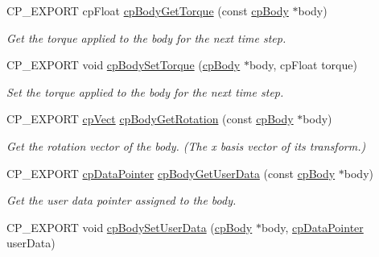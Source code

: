 \begin{DoxyCompactItemize}
C\+P\+\_\+\+E\+X\+P\+O\+RT cp\+Float \hyperlink{group__cpBody_ga77bde17091dff1496e695fbba26037bb}{cp\+Body\+Get\+Torque} (const \hyperlink{structcpBody}{cp\+Body} $\ast$body)
\begin{DoxyCompactList}\small\item\em Get the torque applied to the body for the next time step. \end{DoxyCompactList}\item 
\mbox{\label{group__cpBody_gade0bd4162880703b6e2f7a5de6a2fd0c}} 
C\+P\+\_\+\+E\+X\+P\+O\+RT void \hyperlink{group__cpBody_gade0bd4162880703b6e2f7a5de6a2fd0c}{cp\+Body\+Set\+Torque} (\hyperlink{structcpBody}{cp\+Body} $\ast$body, cp\+Float torque)
\begin{DoxyCompactList}\small\item\em Set the torque applied to the body for the next time step. \end{DoxyCompactList}\item 
\mbox{\label{group__cpBody_ga064d1ba194075ebfe2b5aa45b56a800f}} 
C\+P\+\_\+\+E\+X\+P\+O\+RT \hyperlink{structcpVect}{cp\+Vect} \hyperlink{group__cpBody_ga064d1ba194075ebfe2b5aa45b56a800f}{cp\+Body\+Get\+Rotation} (const \hyperlink{structcpBody}{cp\+Body} $\ast$body)
\begin{DoxyCompactList}\small\item\em Get the rotation vector of the body. (The x basis vector of it\textquotesingle{}s transform.) \end{DoxyCompactList}\item 
\mbox{\label{group__cpBody_gaec65efba933eb1072cc9c1088e15ba1f}} 
C\+P\+\_\+\+E\+X\+P\+O\+RT \hyperlink{group__basicTypes_ga2ac2c3c31e21893941f9e4f8ee279447}{cp\+Data\+Pointer} \hyperlink{group__cpBody_gaec65efba933eb1072cc9c1088e15ba1f}{cp\+Body\+Get\+User\+Data} (const \hyperlink{structcpBody}{cp\+Body} $\ast$body)
\begin{DoxyCompactList}\small\item\em Get the user data pointer assigned to the body. \end{DoxyCompactList}\item 
\mbox{\label{group__cpBody_gab2bb264a606f865e3aaff1536b1d8de8}} 
C\+P\+\_\+\+E\+X\+P\+O\+RT void \hyperlink{group__cpBody_gab2bb264a606f865e3aaff1536b1d8de8}{cp\+Body\+Set\+User\+Data} (\hyperlink{structcpBody}{cp\+Body} $\ast$body, \hyperlink{group__basicTypes_ga2ac2c3c31e21893941f9e4f8ee279447}{cp\+Data\+Pointer} user\+Data)

\end{DoxyCompactItemize}
